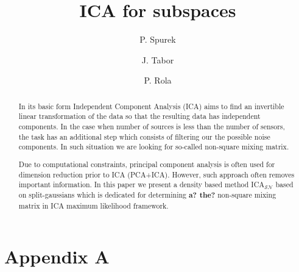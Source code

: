 \documentclass[12pt]{article}
\title{ICA for subspaces}
\author{P. Spurek \and J. Tabor  \and P. Rola}
\date{}
\def\ICA{ICA$_{\mathcal{S\!N}}$}
\def\ICA{ICA$_{\mathcal{S\!N}}$}
\theoremstyle{definition}
\begin{document}
\maketitle

\begin{abstract} 
In its basic form Independent Component Analysis (ICA) aims to find an invertible linear transformation of the data so that the resulting data has independent components. In the case when number of sources is less than the number of sensors, the task has an additional step which consists of filtering our the possible noise components. In such situation we are looking for so-called non-square mixing matrix.

Due to computational constraints, principal component analysis is often used for dimension reduction prior to ICA (PCA+ICA). However, such approach often removes important information.
In this paper we present a density based method \ICA{} based 
on split-gaussians which is dedicated for determining \textbf{a? the?} non-square mixing matrix in ICA maximum likelihood framework.
\end{abstract} 






  




    
\section{Appendix A}
\label{a1}








\end{document}
